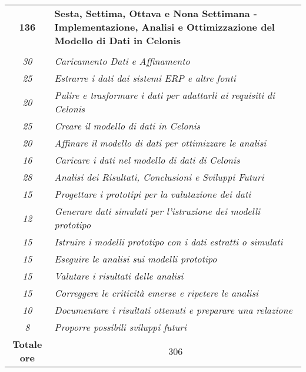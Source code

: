 \begin{tabularx}{\textwidth}{|c|X|}
\textbf{136} & \textbf{Sesta, Settima, Ottava e Nona Settimana - Implementazione, Analisi e Ottimizzazione del Modello di Dati in Celonis} \\ 
\hdashline 
\multirow{5}{0cm}\\ 
\textit{30} & 
\textit{Caricamento Dati e Affinamento} \\
\textit{25} & 
\textit{Estrarre i dati dai sistemi ERP e altre fonti} \\
\textit{20} & 
\textit{Pulire e trasformare i dati per adattarli ai requisiti di Celonis} \\
\textit{25} & 
\textit{Creare il modello di dati in Celonis} \\
\textit{20} & 
\textit{Affinare il modello di dati per ottimizzare le analisi} \\
\textit{16} & 
\textit{Caricare i dati nel modello di dati di Celonis} \\
\hdashline 
\textit{28} & 
\textit{Analisi dei Risultati, Conclusioni e Sviluppi Futuri} \\
\textit{15} & 
\textit{Progettare i prototipi per la valutazione dei dati} \\
\textit{12} & 
\textit{Generare dati simulati per l'istruzione dei modelli prototipo} \\
\textit{15} & 
\textit{Istruire i modelli prototipo con i dati estratti o simulati} \\
\textit{15} & 
\textit{Eseguire le analisi sui modelli prototipo} \\
\textit{15} & 
\textit{Valutare i risultati delle analisi} \\
\textit{15} & 
\textit{Correggere le criticità emerse e ripetere le analisi} \\
\textit{10} & 
\textit{Documentare i risultati ottenuti e preparare una relazione} \\
\textit{8} & 
\textit{Proporre possibili sviluppi futuri} \\
\hline

\textbf{Totale ore} & \multicolumn{1}{|c|}{306} \\\hline

	
	
\end{tabularx}